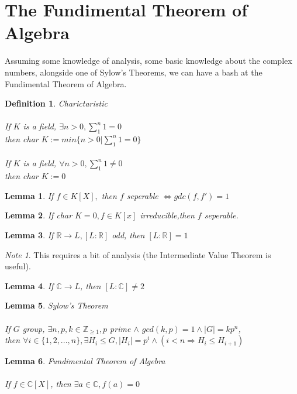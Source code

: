 \documentclass{article}
\theoremstyle{definitionstyle}
\newtheorem{defn}{Definition}[section]
\theoremstyle{lemmastyle}
\newtheorem{lem}{Lemma}[section]
\theoremstyle{remark}
\newtheorem*{note}{Note}
\begin{document}
\section{The Fundimental Theorem of Algebra}

Assuming some knowledge of analysis, some basic knowledge about the complex numbers, alongside one of Sylow's Theorems, we can have a bash at the Fundimental Theorem of Algebra.

\begin{defn} Charictaristic\\
\\
If $K$ is a field, $ \exists n > 0, \displaystyle\sum_{1}^{n} 1 = 0$\\

then char $K := min\{n > 0 | \sum_{1}^{n} 1 = 0\}$\\
\\
If $K$ is a field, $\forall n> 0, \displaystyle\sum_{1}^{n} 1 \ne 0$\\

then char $K := 0$\\ \end{defn}

\begin{lem} If $f \in K[X],$ then $f$ seperable $\iff gdc(f, f') = 1$ \end{lem}

\begin{lem} If char $K = 0, f \in K[x]$ irreducible,then $f$ seperable. \end{lem}

\begin{lem} If $\mathbb{R} \to L, [L : \mathbb{R}]$ odd, then $[L : \mathbb{R}] = 1$ \end{lem}

\begin{note} This requires a bit of analysis (the Intermediate Value Theorem is useful). \end{note}

\begin{lem} If $\mathbb{C} \to L$, then $[L :\mathbb{C}] \ne 2$ \end{lem}

\begin{lem} Sylow's Theorem\\
\\
If $G$ group, $\exists n, p, k \in \mathbb{Z}_{\ge 1}, p$ prime $\land$ $gcd(k, p) = 1 \land|G| = k p^n$,\\

then $\forall i \in \{1, 2, ..., n\}, \exists H_i \le G, |H_i| = p^i \land (i < n \Rightarrow H_i \le H_{i+1})$\\ \end{lem}

\begin{lem} Fundimental Theorem of Algebra\\
\\
If $f \in \mathbb{C}[X]$, then $\exists a \in \mathbb{C}, f(a) = 0$ \end{lem}
\end{document}
